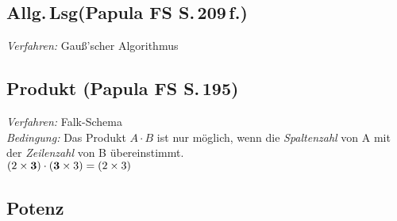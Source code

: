 \documentclass[a4paper,10pt,titlepage]{scrartcl}
\begin{document}
\subsection*{Allg.\,Lsg{\fontsize{9pt}{0pt}\selectfont\normalfont (Papula FS S.\,209\,f.)}}
\label{sec:allg_lsg}
\emph{Verfahren:} Gauß'scher Algorithmus
\bigskip\\


\subsection*{Produkt {\fontsize{9pt}{0pt}\selectfont\normalfont (Papula FS S.\,195)}}
\label{sec:produkt}
\emph{Verfahren:} Falk-Schema\\
\emph{Bedingung:} Das Produkt $A\cdot B$ ist nur möglich, wenn die \emph{Spaltenzahl} von A mit der \emph{Zeilenzahl} von B übereinstimmt.\\
\hspace*{2cm} $(2\times\text{{\bfseries\selectfont 3}})\cdot(\text{{\bfseries 3}}\times3)=(2\times3)$

\subsection*{Potenz}
\label{sec:potenz}
\end{document}
